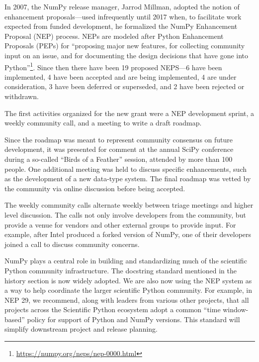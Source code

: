 \documentclass[fleqn,10pt]{wlscirep}
\begin{document}

In 2007, the NumPy release manager, Jarrod Millman, adopted the notion
of enhancement proposals---used infrequently until 2017 when, to
facilitate work expected from funded development, he formalized the
NumPy Enhancement Proposal (NEP) process.  NEPs are modeled after
Python Enhancement Proposals (PEPs) for ``proposing major new
features, for collecting community input on an issue, and for
documenting the design decisions that have gone into
Python''\footnote{\url{https://numpy.org/neps/nep-0000.html}}.
Since then there have been 19 proposed NEPS---6 have been implemented,
4 have been accepted and are being implemented, 4 are under
consideration, 3 have been deferred or superseded, and 2 have been rejected
or withdrawn.

The first activities organized for the new grant were a NEP development
sprint, a weekly community call, and a meeting to write a draft roadmap.

Since the roadmap was meant to represent community consensus on future
development, it was presented for comment at the annual SciPy
conference during a so-called ``Birds of a Feather'' session, attended
by more than 100 people.  One additional meeting was held to discuss
specific enhancements, such as the development of a new data-type
system.  The final roadmap was vetted by the community via online
discussion before being accepted.

The weekly community calls alternate weekly between triage meetings and
higher level discussion.  The calls not only involve developers from
the community, but provide a venue for vendors and other external
groups to provide input.  For example, after Intel produced a forked
version of NumPy, one of their developers joined a call to discuss
community concerns.

NumPy plays a central role in building and standardizing much of the scientific
Python community infrastructure.
The docstring standard mentioned in the history section is now widely adopted.
We are also now using the NEP system as a way to help coordinate the larger
scientific Python community.
For example, in NEP 29, we recommend, along with leaders from various other
projects, that all projects across the Scientific Python ecosystem adopt a
common ``time window-based'' policy for support of Python and NumPy versions.
This standard will simplify downstream project and release planning.

\end{document}
